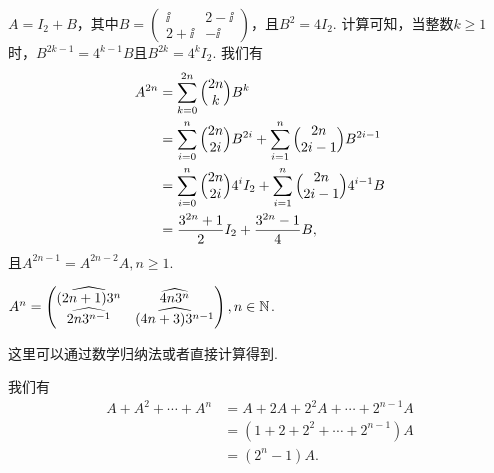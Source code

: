 \begin{solution}
  $A=I_2+B$，其中$B=\begin{pmatrix}
    \ii & 2 - \ii \\
    2 + \ii & - \ii
  \end{pmatrix}$，且$B^2=4I_2$. 计算可知，当整数$k\ge1$时，$B^{2k-1}=4^{k-1}B$且$B^{2k}=4^kI_2$. 我们有
  \begin{align*}
    A^{2n} & = \sum_{k=0}^{2n} \Binom{2n}k B^k \\
    & = \sum_{i=0}^n\Binom{2n}{2i}B^{2i} + \sum_{i=1}^n\Binom{2n}{2i-1}B^{2i-1} \\
    & = \sum_{i=0}^n\Binom{2n}{2i} 4^iI_2 + \sum_{i=1}^n\Binom{2n}{2i-1} 4^{i-1}B \\
    & = \frac{3^{2n}+1}2I_2 + \frac{3^{2n}-1}4B ,
  \end{align*}
  且$A^{2n-1}=A^{2n-2}A,n\ge1$.
\end{solution}

\begin{solution}
  $A^n=\begin{pmatrix}
    \widehat{(2n+1)3^n} & \widehat{4n3^n} \\
    \widehat{2n3^{n-1}} & \widehat{(4n+3)3^{n-1}}
  \end{pmatrix},n\in\mathbb N$.
\end{solution}

\begin{solution}
  \begin{inparaenum}[(a)]
    \item 这里可以通过数学归纳法或者直接计算得到.

    \item 我们有
    \begin{align*}
      A + A^2 + \cdots + A^n & = A + 2A + 2^2A + \cdots + 2^{n-1}A \\
      & = (1 + 2 + 2^2 + \cdots +2^{n-1})A \\
      & = (2^n - 1)A.
    \end{align*}
  \end{inparaenum}
\end{solution}

